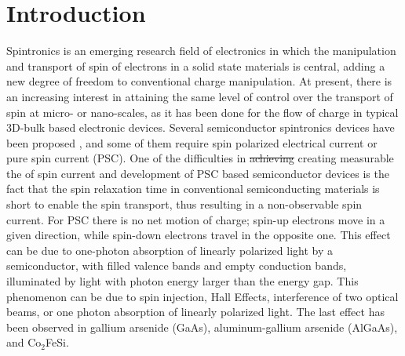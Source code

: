 \documentclass[floatfix,prb,aps,superscriptaddress,showpacs,11pt,preprint,letterpaper]{revtex4}
\begin{document}
\section{Introduction}
\label{sec:introduction}

Spintronics is an emerging research field of electronics in which the
manipulation and transport of spin of electrons in a solid state materials  is
central, adding a new degree of freedom to conventional charge
manipulation.\cite{wolfSC04,fabianAPS07} At present, there is an increasing
interest in attaining the same level of control over the transport of spin at
micro- or nano-scales, as it has been done for the flow of charge in typical
3D-bulk based electronic devices.\cite{awschalomNP2007} Several semiconductor
spintronics devices have been proposed \cite{majumdarAPL06,
dattaAPL90,gotteNat16,pershinPRB08}, and some of them require spin polarized
electrical current \cite{awschalomSSBM13} or pure spin current (PSC). One of
the difficulties in {\color{red}\st{achieving}} {\color{blue}creating} measurable  the of spin current and
development of PSC based semiconductor devices is the fact that the spin
relaxation time in conventional semiconducting materials is short to enable the
spin transport, thus resulting in a non-observable spin
current.\cite{murakamiSc03} For PSC there is no net motion of charge; spin-up
electrons move in a given direction, while spin-down electrons travel in the
opposite one. This effect can be due to one-photon absorption of linearly
polarized light by a semiconductor, with filled valence bands and empty
conduction bands, illuminated by light with photon energy larger than the
energy gap. This phenomenon can be due to spin injection,\cite{malPRB03} Hall
Effects,\cite{sinovaPRB04} interference of two optical beams,\cite{bhatPRL00,
najmaiePRB03} or one photon absorption of linearly polarized
light\cite{bhatPRL05}. The last effect has been observed in gallium arsenide
(GaAs),\cite{zhaoPRL2006, stevensPRL03} aluminum-gallium arsenide
(AlGaAs),\cite{stevensPRL03} and Co$_2$FeSi.\cite{kimuraNGPAM12}
\end{document}
